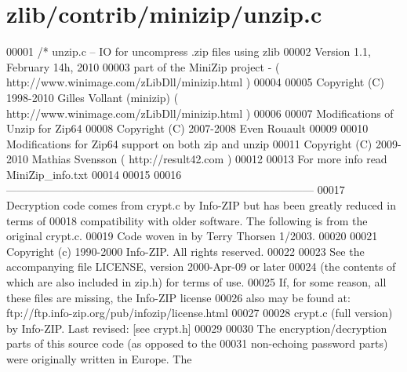 \hypertarget{zlib_2contrib_2minizip_2unzip_8c_source}{}\section{zlib/contrib/minizip/unzip.c}
\label{zlib_2contrib_2minizip_2unzip_8c_source}

\begin{DoxyCode}
00001 \textcolor{comment}{/* unzip.c -- IO for uncompress .zip files using zlib}
00002 \textcolor{comment}{   Version 1.1, February 14h, 2010}
00003 \textcolor{comment}{   part of the MiniZip project - ( http://www.winimage.com/zLibDll/minizip.html )}
00004 \textcolor{comment}{}
00005 \textcolor{comment}{         Copyright (C) 1998-2010 Gilles Vollant (minizip) ( http://www.winimage.com/zLibDll/minizip.html )}
00006 \textcolor{comment}{}
00007 \textcolor{comment}{         Modifications of Unzip for Zip64}
00008 \textcolor{comment}{         Copyright (C) 2007-2008 Even Rouault}
00009 \textcolor{comment}{}
00010 \textcolor{comment}{         Modifications for Zip64 support on both zip and unzip}
00011 \textcolor{comment}{         Copyright (C) 2009-2010 Mathias Svensson ( http://result42.com )}
00012 \textcolor{comment}{}
00013 \textcolor{comment}{         For more info read MiniZip\_info.txt}
00014 \textcolor{comment}{}
00015 \textcolor{comment}{}
00016 \textcolor{comment}{  ------------------------------------------------------------------------------------}
00017 \textcolor{comment}{  Decryption code comes from crypt.c by Info-ZIP but has been greatly reduced in terms of}
00018 \textcolor{comment}{  compatibility with older software. The following is from the original crypt.c.}
00019 \textcolor{comment}{  Code woven in by Terry Thorsen 1/2003.}
00020 \textcolor{comment}{}
00021 \textcolor{comment}{  Copyright (c) 1990-2000 Info-ZIP.  All rights reserved.}
00022 \textcolor{comment}{}
00023 \textcolor{comment}{  See the accompanying file LICENSE, version 2000-Apr-09 or later}
00024 \textcolor{comment}{  (the contents of which are also included in zip.h) for terms of use.}
00025 \textcolor{comment}{  If, for some reason, all these files are missing, the Info-ZIP license}
00026 \textcolor{comment}{  also may be found at:  ftp://ftp.info-zip.org/pub/infozip/license.html}
00027 \textcolor{comment}{}
00028 \textcolor{comment}{        crypt.c (full version) by Info-ZIP.      Last revised:  [see crypt.h]}
00029 \textcolor{comment}{}
00030 \textcolor{comment}{  The encryption/decryption parts of this source code (as opposed to the}
00031 \textcolor{comment}{  non-echoing password parts) were originally written in Europe.  The}

\end{DoxyCode}
